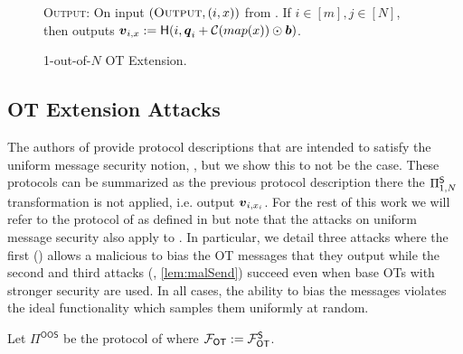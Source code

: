 \begin{figure}[t!]
{\begin{minipage}{0.95\linewidth}
			
			\textsc{Output:} On input $(\textsc{Output}, (i,x))$ from \send. If $i\in[m],j\in[N]$, then \send outputs $\boldsymbol{v}_{i,x}:=\mathsf{H}(i,\boldsymbol{q}_i+\mathcal{C}(map(x))\odot \boldsymbol{b})$.
	\end{minipage}}
	\caption{ 1-out-of-$N$ OT Extension.}
	\label{fig:otExt}
\end{figure}


%			


\subsection{OT Extension Attacks}\label{sec:extAttack}


The authors of \cite{C:KelOrsSch15,RSA:OrrOrsSch17} provide protocol descriptions that are intended to satisfy the uniform message security notion, , but we show this to not be the case. These protocols can be summarized as the previous protocol description there the $\Pi^{\mathsf{S}}_{1,N}$ transformation is not applied, i.e. output $\boldsymbol{v}_{i,x_i}$.  For the rest of this work we will refer to the protocol of \cite{RSA:OrrOrsSch17} as defined in  but note that the attacks on uniform message security also apply to \cite[Figure 6, 7]{C:KelOrsSch15}. In particular, we detail three attacks where the first ()  allows a malicious \rec to bias the OT messages that they output while the second and third attacks (, \ref{lem:malSend}) succeed even when base OTs with stronger security are used. In all cases, the ability to bias the messages violates the ideal functionality which samples them uniformly at random.


\begin{definition}\label{def:OOS}
	Let $\Pi^{\textsf{OOS}}$ be the protocol of  where $\mathcal{F}_{\mathsf{OT}}:=\mathcal{F}_{\mathsf{OT}}^\mathsf{S}$.
\end{definition}

